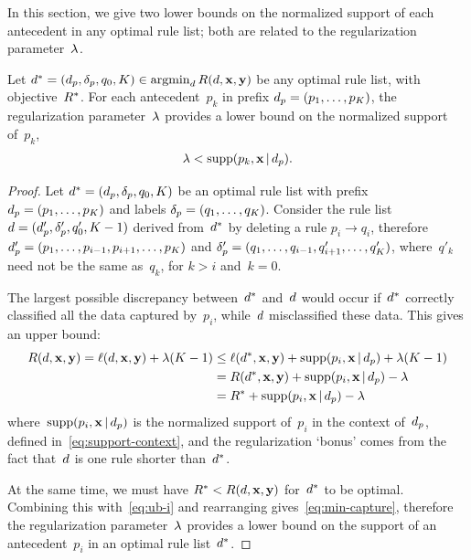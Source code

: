 In this section, we give two lower bounds on the normalized support
of each antecedent in any optimal rule list;
both are related to the regularization parameter~${\lambda}$.

\begin{theorem}
\label{thm:min-capture}
Let ${d^* = (d_p, \delta_p, q_0, K) \in \operatorname*{argmin}_{d} R({d}, \mathbf{x}, \mathbf{y})}$
be any optimal rule list, with objective~$R^*$.
%
For each antecedent~$p_k$ in prefix ${d_p = (p_1, \dots, p_K)}$,
the regularization parameter~${\lambda}$ provides a lower bound
on the normalized support of~$p_k$,
\begin{align}
\Reg < \Supp(p_k, \x \given \Prefix).
\label{eq:min-capture}
\end{align}
\end{theorem}

\begin{proof}
Let ${d^* = (d_p, \delta_p, q_0, K)}$ be an optimal
rule list with prefix ${d_p = (p_1, \dots, p_K)}$
and labels ${\delta_p = (q_1, \dots, q_K)}$.
%
Consider the rule list ${{d} = (d_p', \delta_p', q_0', K-1)}$
derived from~$d^*$ by deleting a rule ${p_i \rightarrow q_i}$,
therefore ${d_p' = (p_1, \dots, p_{i-1}, p_{i+1}, \dots, p_K)}$
and ${\delta_p' = (q_1, \dots, q_{i-1}, q'_{i+1}, \dots, q'_K)}$,
where~$q'_k$ need not be the same as~$q_k$, for ${k > i}$ and~${k = 0}$.

The largest possible discrepancy between~$d^*$ and~${d}$ would occur
if~$d^*$ correctly classified all the data captured by~$p_i$,
while~${d}$ misclassified these data.
%
This gives an upper bound:
\begin{align}
\Obj(\RL, \x, \y) = \Loss(\RL, \x, \y) + \Reg (K - 1)
&\le \Loss(\OptimalRL, \x, \y) + \Supp(p_i, \x \given \Prefix) + \Reg(K - 1) \nn \\
&= \Obj(\OptimalRL, \x, \y) + \Supp(p_i, \x \given \Prefix) - \Reg \nn \\
&= \OptimalObj + \Supp(p_i, \x \given \Prefix) - \Reg
\label{eq:ub-i}
\end{align}
where~$\textnormal{supp}(p_i, \mathbf{x} \,|\, d_p)$ is the normalized support of~$p_i$
in the context of~$d_p$, defined in~\eqref{eq:support-context},
and the regularization `bonus' comes from the fact that~${d}$
is one rule shorter than~$d^*$.

At the same time, we must have ${R^* < R({d}, \mathbf{x}, \mathbf{y})}$ for~$d^*$ to be optimal.
%
Combining this with~\eqref{eq:ub-i} and rearranging gives~\eqref{eq:min-capture},
therefore the regularization parameter~${\lambda}$ provides a lower bound
on the support of an antecedent~$p_i$ in an optimal rule list~$d^*$.
\end{proof}


